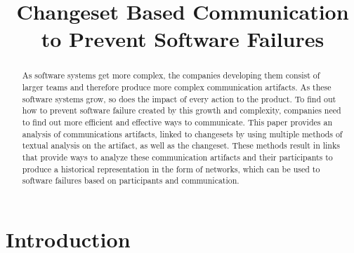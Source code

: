 \documentclass[conference]{IEEEtran}
\begin{document}
\title{Changeset Based Communication to Prevent Software Failures}

\author{
\and
{}
\and
{}
}

\maketitle


\begin{abstract}
As software systems get more complex, the companies developing them consist of larger teams and therefore produce more complex communication artifacts.  As these software systems grow, so does the impact of every action to the product.  To find out how to prevent software failure created by this growth and complexity, companies need to find out more efficient and effective ways to communicate.  This paper provides an analysis of communications artifacts, linked to changesets by using multiple methods of textual analysis on the artifact, as well as the changeset.  These methods result in links that provide ways to analyze these communication artifacts and their participants to produce a historical representation in the form of networks, which can be used to software failures based on participants and communication.
\end{abstract}

\section{Introduction}
\end{document}
